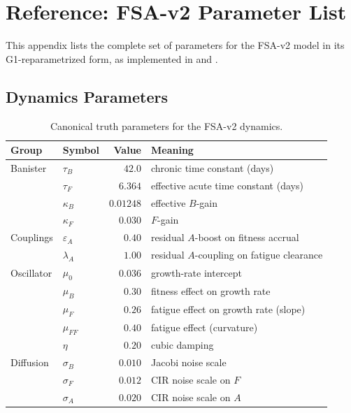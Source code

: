\appendix
\section{Reference: FSA-v2 Parameter List}

This appendix lists the complete set of parameters for the FSA-v2 model in its G1-reparametrized form, as implemented in  and .

\subsection{Dynamics Parameters}

\begin{table}[h]
\centering
\small
\begin{tabular}{@{}llrl@{}}
\toprule
Group & Symbol & Value & Meaning \\
\midrule
Banister & $\tau_B$ & $42.0$ & chronic time constant (days) \\
         & $\tau_F$ & $6.364$ & effective acute time constant (days) \\
         & $\kappa_B$ & $0.01248$ & effective $B$-gain \\
         & $\kappa_F$ & $0.030$ & $F$-gain \\
\midrule
Couplings & $\varepsilon_A$ & $0.40$ & residual $A$-boost on fitness accrual \\
          & $\lambda_A$ & $1.00$ & residual $A$-coupling on fatigue clearance \\
\midrule
Oscillator & $\mu_0$ & $0.036$ & growth-rate intercept \\
           & $\mu_B$ & $0.30$ & fitness effect on growth rate \\
           & $\mu_F$ & $0.26$ & fatigue effect on growth rate (slope) \\
           & $\mu_{FF}$ & $0.40$ & fatigue effect (curvature) \\
           & $\eta$ & $0.20$ & cubic damping \\
\midrule
Diffusion & $\sigma_B$ & $0.010$ & Jacobi noise scale \\
          & $\sigma_F$ & $0.012$ & CIR noise scale on $F$ \\
          & $\sigma_A$ & $0.020$ & CIR noise scale on $A$ \\
\bottomrule
\end{tabular}
\caption{Canonical truth parameters for the FSA-v2 dynamics.}
\end{table}

